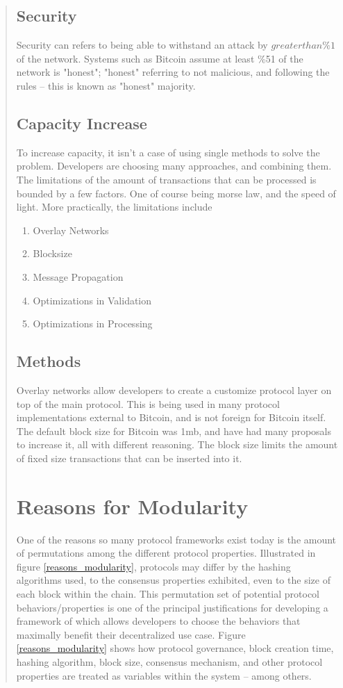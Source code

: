 \documentclass[12pt, titlepage, twocolumn]{report}
\begin{document}
\begin{quotation}
\subsection{Security}
Security can refers to being able to withstand an attack by \(greater than\%1\) of the network. Systems such as Bitcoin assume at least \%51 of the network is "honest"; "honest" referring to not malicious, and following the rules -- this is known as "honest" majority.

\subsection{Capacity Increase}
To increase capacity, it isn't a case of using single methods to solve the problem. Developers are choosing many approaches, and combining them. The limitations of the amount of transactions that can be processed is bounded by a few factors. One of course being morse law, and the speed of light. More practically, the limitations include

\begin{enumerate}
	\item Overlay Networks
	\item Blocksize
	\item Message Propagation
	\item Optimizations in Validation
	\item Optimizations in Processing
\end{enumerate}

\subsection{Methods}
Overlay networks allow developers to create a customize protocol layer on top of the main protocol. This is being used in many protocol implementations external to Bitcoin, and is not foreign for Bitcoin itself. The default block size for Bitcoin was 1mb, and have had many proposals to increase it, all with different reasoning. The block size limits the amount of fixed size transactions that can be inserted into it.


\section{Reasons for Modularity}
One of the reasons so many protocol frameworks exist today is the amount of permutations among the different protocol properties. Illustrated in figure \ref{reasons_modularity}, protocols may differ by the hashing algorithms used, to the consensus properties exhibited, even to the size of each block within the chain.  This permutation set of potential protocol behaviors/properties is one of the principal justifications for developing a framework of which allows developers to choose the behaviors that maximally benefit their decentralized use case. Figure \ref{reasons_modularity} shows how protocol governance, block creation time, hashing algorithm, block size, consensus mechanism, and other protocol properties are treated as variables within the system -- among others.


\end{quotation}
\end{document}

